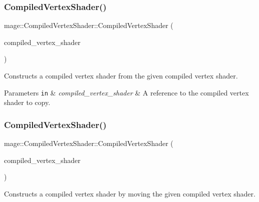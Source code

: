 \subsubsection{\texorpdfstring{Compiled\+Vertex\+Shader()}{CompiledVertexShader()}\hspace{0.1cm}{\footnotesize\ttfamily [3/4]}}
{\footnotesize\ttfamily mage\+::\+Compiled\+Vertex\+Shader\+::\+Compiled\+Vertex\+Shader (\begin{DoxyParamCaption}\item[{const \hyperlink{structmage_1_1_compiled_vertex_shader}{Compiled\+Vertex\+Shader} \&}]{compiled\+\_\+vertex\+\_\+shader }\end{DoxyParamCaption})\hspace{0.3cm}{\ttfamily [default]}}

Constructs a compiled vertex shader from the given compiled vertex shader.


\begin{DoxyParams}[1]{Parameters}
\mbox{\tt in}  & {\em compiled\+\_\+vertex\+\_\+shader} & A reference to the compiled vertex shader to copy. \\
\hline
\end{DoxyParams}
\hypertarget{structmage_1_1_compiled_vertex_shader_a9101da0cf1f08e55d33bfadda3e98f94}{}\label{structmage_1_1_compiled_vertex_shader_a9101da0cf1f08e55d33bfadda3e98f94} 
\subsubsection{\texorpdfstring{Compiled\+Vertex\+Shader()}{CompiledVertexShader()}\hspace{0.1cm}{\footnotesize\ttfamily [4/4]}}
{\footnotesize\ttfamily mage\+::\+Compiled\+Vertex\+Shader\+::\+Compiled\+Vertex\+Shader (\begin{DoxyParamCaption}\item[{\hyperlink{structmage_1_1_compiled_vertex_shader}{Compiled\+Vertex\+Shader} \&\&}]{compiled\+\_\+vertex\+\_\+shader }\end{DoxyParamCaption})\hspace{0.3cm}{\ttfamily [default]}}

Constructs a compiled vertex shader by moving the given compiled vertex shader.


